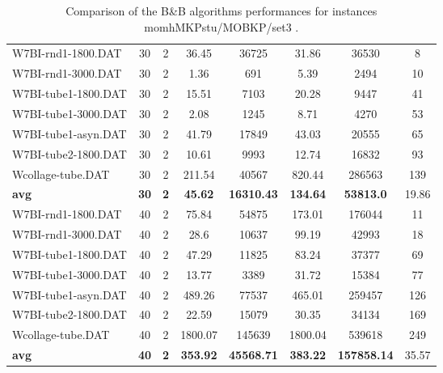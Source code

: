 \begin{table}[!ht]
{\begin{tabular}{lccccccc}
W7BI-rnd1-1800.DAT & 30 & 2 & 36.45 & 36725 &  \textcolor{blue2}{31.86} & 36530 & 8 \\
W7BI-rnd1-3000.DAT & 30 & 2 &  \textcolor{blue2}{1.36} & 691 & 5.39 & 2494 & 10 \\
W7BI-tube1-1800.DAT & 30 & 2 &  \textcolor{blue2}{15.51} & 7103 & 20.28 & 9447 & 41 \\
W7BI-tube1-3000.DAT & 30 & 2 &  \textcolor{blue2}{2.08} & 1245 & 8.71 & 4270 & 53 \\
W7BI-tube1-asyn.DAT & 30 & 2 &  \textcolor{blue2}{41.79} & 17849 & 43.03 & 20555 & 65 \\
W7BI-tube2-1800.DAT & 30 & 2 &  \textcolor{blue2}{10.61} & 9993 & 12.74 & 16832 & 93 \\
Wcollage-tube.DAT & 30 & 2 &  \textcolor{blue2}{211.54} & 40567 & 820.44 & 286563 & 139 \\
\cline{1-8} \textbf{avg} & \textbf{30} & \textbf{2} & \textbf{45.62} & \textbf{16310.43} & \textbf{134.64} & \textbf{53813.0} & 19.86\\ \cline{1-8}
W7BI-rnd1-1800.DAT & 40 & 2 &  \textcolor{blue2}{75.84} & 54875 & 173.01 & 176044 & 11 \\
W7BI-rnd1-3000.DAT & 40 & 2 &  \textcolor{blue2}{28.6} & 10637 & 99.19 & 42993 & 18 \\
W7BI-tube1-1800.DAT & 40 & 2 &  \textcolor{blue2}{47.29} & 11825 & 83.24 & 37377 & 69 \\
W7BI-tube1-3000.DAT & 40 & 2 &  \textcolor{blue2}{13.77} & 3389 & 31.72 & 15384 & 77 \\
W7BI-tube1-asyn.DAT & 40 & 2 & 489.26 & 77537 &  \textcolor{blue2}{465.01} & 259457 & 126 \\
W7BI-tube2-1800.DAT & 40 & 2 &  \textcolor{blue2}{22.59} & 15079 & 30.35 & 34134 & 169 \\
Wcollage-tube.DAT & 40 & 2 & 1800.07 & 145639 &  \textcolor{blue2}{1800.04} & 539618 & 249 \\
\cline{1-8} \textbf{avg} & \textbf{40} & \textbf{2} & \textbf{353.92} & \textbf{45568.71} & \textbf{383.22} & \textbf{157858.14} & 35.57\\ \cline{1-8}
\bottomrule
\end{tabular}
}%
\caption{Comparison of the B\&B algorithms performances for instances momhMKPstu/MOBKP/set3 .}
\label{tab:table_compareBB_momhMKPstu/MOBKP/set3 }
\end{table}
